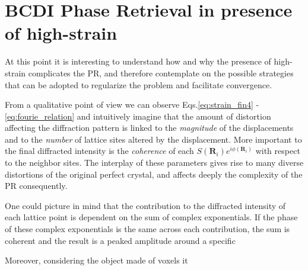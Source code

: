 \section{BCDI Phase Retrieval in presence of high-strain}

At this point it is interesting to understand how and why the presence of high-strain complicates the PR,
and therefore contemplate on the possible strategies that can be adopted to regularize the problem and facilitate convergence. 

From a qualitative point of view we can observe Eqs.\ref{eq:strain_fin4} - \ref{eq:fourie_relation} and intuitively 
imagine that the amount of distortion affecting the diffraction pattern is linked to the \textit{magnitude} of 
the displacements and to the \textit{number} of lattice sites altered by the displacement. More important to the final 
diffracted intensity is the \textit{coherence} of each $S(\mathbf{R}_i) e^{i \phi(\mathbf{R}_i)}$ 
with respect to the neighbor sites. The interplay of these parameters gives rise to many diverse distortions of the original 
perfect crystal, and affects deeply the complexity of the PR consequently. 

One could picture in mind that the contribution to the diffracted intensity of each lattice point is dependent on the 
sum of complex exponentials. If the phase of these complex exponentials is the same across each contribution, the sum 
is coherent and the result is a peaked amplitude around a specific 

Moreover, considering the object made of voxels it 





